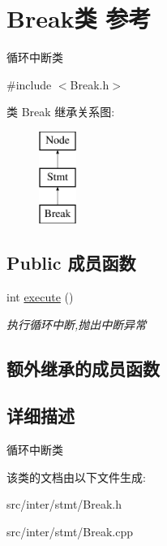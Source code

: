 \hypertarget{class_break}{}\section{Break类 参考}
\label{class_break}


循环中断类  




{\ttfamily \#include $<$Break.\+h$>$}

类 Break 继承关系图\+:\begin{figure}[H]
\begin{center}
\leavevmode
\includegraphics[height=3.000000cm]{class_break}
\end{center}
\end{figure}
\subsection*{Public 成员函数}
\begin{DoxyCompactItemize}
\item 
int \hyperlink{class_break_a554fd4cae05d203145d62868f73004d4}{execute} ()\hypertarget{class_break_a554fd4cae05d203145d62868f73004d4}{}\label{class_break_a554fd4cae05d203145d62868f73004d4}

\begin{DoxyCompactList}\small\item\em 执行循环中断,抛出中断异常 \end{DoxyCompactList}\end{DoxyCompactItemize}
\subsection*{额外继承的成员函数}


\subsection{详细描述}
循环中断类 

该类的文档由以下文件生成\+:\begin{DoxyCompactItemize}
\item 
src/inter/stmt/Break.\+h\item 
src/inter/stmt/Break.\+cpp\end{DoxyCompactItemize}
